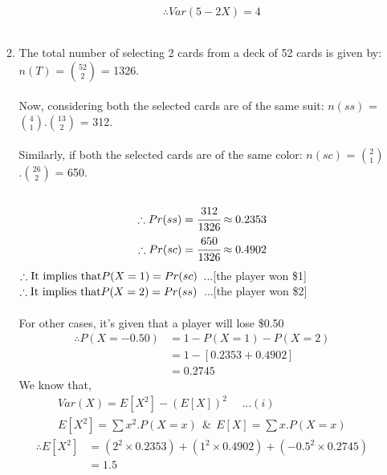 \documentclass{article}
\begin{document}
\begin{enumerate}
\begin{enumerate}
\begin{enumerate}
\begin{align*}
            \end{align*}
            \[
                \boxed{\therefore Var(5 - 2X) = 4}
            \]\\
        \end{enumerate}
    \item
        The total number of selecting 2 cards from a deck of 52 cards is given by: \(n(T)\) = \(\binom{52}{2}\) = 1326.\\\\
        Now, considering both the selected cards are of the same suit: \(n(ss)\) = \(\binom{4}{1}\).\(\binom{13}{2}\) = 312.\\\\
        Similarly, if both the selected cards are of the same color: \(n(sc)\) = \(\binom{2}{1}\).\(\binom{26}{2}\) = 650.\\\\
        \begin{align*}
            \therefore Pr(ss) = \cfrac{312}{1326} \approx 0.2353\\
            \therefore Pr(sc) = \cfrac{650}{1326} \approx 0.4902\\
        \end{align*}
        \(\therefore \textnormal{It implies that} P(X=1) = Pr(sc)\)\ ...[the player won \$1]\\
        \(\therefore \textnormal{It implies that} P(X=2) = Pr(ss)\)\ ...[the player won \$2]\\\\
        For other cases, it's given that a player will lose \$0.50
        \begin{align*}
        \therefore P(X= -0.50) &= 1 - P(X=1) - P(X=2)\\
        &= 1- [0.2353 + 0.4902]\\
        &= 0.2745
        \end{align*}
        We know that,
        \begin{align*}
            Var(X) = E[X^2] - (E[X])^2\ \ \ \ \ \ ...(i)\\
            E[X^2] = \sum x^2.P(X=x)\ \ \& \ \ E[X] = \sum x.P(X=x)
        \end{align*}
        \begin{align*}
            \therefore  E[X^2] &= (2^2\times 0.2353) + (1^2\times 0.4902) + (-0.5^2\times 0.2745)\\
            &= 1.5
        \end{align*}
        \begin{align*}

\end{align*}
\end{enumerate}
\end{enumerate}
\end{document}
